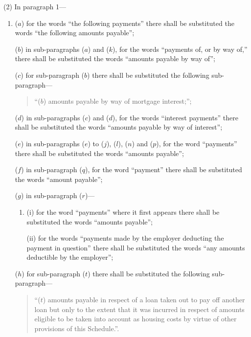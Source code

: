 \documentclass[12pt,a4paper]{article}
\begin{document}
(2) In paragraph 1—
\begin{enumerate}\item[]
($a$) for the words “the following payments” there shall be substituted the words “the following amounts payable”;

($b$) in sub-paragraphs ($a$) and ($k$), for the words “payments of, or by way of,” there shall be substituted the words “amounts payable by way of”;

($c$) for sub-paragraph ($b$) there shall be substituted the following sub-paragraph—
\begin{quotation}
“($b$) amounts payable by way of mortgage interest;”;
\end{quotation}

($d$) in sub-paragraphs ($c$) and ($d$), for the words “interest payments” there shall be substituted the words “amounts payable by way of interest”;

($e$) in sub-paragraphs ($e$) to ($j$), ($l$), ($n$) and ($p$), for the word “payments” there shall be substituted the words “amounts payable”;

($f$) in sub-paragraph ($q$), for the word “payment” there shall be substituted the words “amount payable”;

($g$) in sub-paragraph ($r$)—
\begin{enumerate}\item[]
(i) for the word “payments” where it first appears there shall be substituted the words “amounts payable”;

(ii) for the words “payments made by the employer deducting the payment in question” there shall be substituted the words “any amounts deductible by the employer”;
\end{enumerate}

($h$) for sub-paragraph ($t$) there shall be substituted the following sub-paragraph—
\begin{quotation}
“($t$) amounts payable in respect of a loan taken out to pay off another loan but only to the extent that it was incurred in respect of amounts eligible to be taken into account as housing costs by virtue of other provisions of this Schedule.”.
\end{quotation}
\end{enumerate}
\end{document}
